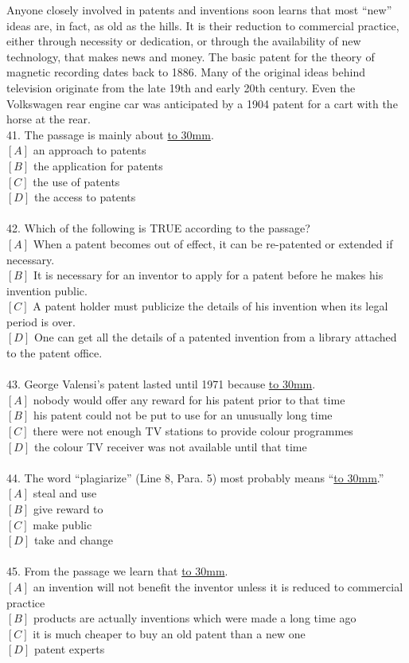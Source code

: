 \documentclass[a4paper]{article}
\begin{document}
\par
Anyone closely involved in patents and inventions soon learns that most “new” ideas are, in fact, as old as the hills. It is their reduction to commercial practice, either through necessity or dedication, or through the availability of new technology, that makes news and money. The basic patent for the theory of magnetic recording dates back to 1886. Many of the original ideas behind television originate from the late 19th and early 20th century. Even the Volkswagen rear engine car was anticipated by a 1904 patent for a cart with the horse at the rear.
\\41.	The passage is mainly about \underline{\hbox to 30mm{}}.\\$[A]$ an approach to patents\\$[B]$ the application for patents\\$[C]$ the use of patents\\$[D]$ the access to patents\\\\42.	Which of the following is TRUE according to the passage?\\$[A]$ When a patent becomes out of effect, it can be re-patented or extended if necessary.\\$[B]$ It is necessary for an inventor to apply for a patent before he makes his invention public.\\$[C]$ A patent holder must publicize the details of his invention when its legal period is over.\\$[D]$ One can get all the details of a patented invention from a library attached to the patent office.\\\\43.	George Valensi’s patent lasted until 1971 because \underline{\hbox to 30mm{}}.\\$[A]$ nobody would offer any reward for his patent prior to that time\\$[B]$ his patent could not be put to use for an unusually long time\\$[C]$ there were not enough TV stations to provide colour programmes\\$[D]$ the colour TV receiver was not available until that time\\\\44.	The word “plagiarize” (Line 8, Para. 5) most probably means “\underline{\hbox to 30mm{}}.”\\$[A]$ steal and use\\$[B]$ give reward to\\$[C]$ make public\\$[D]$ take and change\\\\45.	From the passage we learn that \underline{\hbox to 30mm{}}.\\$[A]$ an invention will not benefit the inventor unless it is reduced to commercial practice\\$[B]$ products are actually inventions which were made a long time ago\\$[C]$ it is much cheaper to buy an old patent than a new one\\$[D]$ patent experts 
\end{document}
